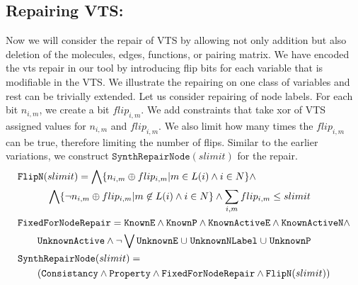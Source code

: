 \subsection{Repairing VTS:}
%
Now we will consider the repair of VTS by allowing not only addition but also
deletion of the molecules, edges, functions, or pairing matrix.
%
We have encoded the vts repair in our tool by introducing flip bits
for each variable that is modifiable in the VTS.
%
We illustrate the repairing on one class of variables and rest can be
trivially extended.
%
Let us consider repairing of node labels.
%
For each bit $n_{i,m}$, we create a bit $flip_{i,m}$.
%
We add constraints that take xor of VTS assigned values for  $n_{i,m}$
and $flip_{i,m}$.
%
We also limit how many times the $flip_{i,m}$ can be true, therefore
limiting the number of flips.
%
Similar to the earlier variations, we construct
$\texttt{SynthRepairNode}(slimit)$ for the repair.
% 
\begin{align*}
    &\texttt{FlipN}(slimit) = \bigwedge \{n_{i,m}\oplus flip_{i,m}| m \in L(i) \land i \in N \} \land \\
  & \quad \quad \quad
    \bigwedge \{ \lnot n_{i,m}\oplus flip_{i,m}| m \not \in L(i) \land i \in N \} \land  \sum\limits_{i,m} flip_{i,m} \leq slimit \\
    & \texttt{FixedForNodeRepair} =  \texttt{KnownE} \land  
      \texttt{KnownP} \land \texttt{KnownActiveE} \land \texttt{KnownActiveN}
      \land \\
  & \quad \quad \texttt{UnknownActive} \land \lnot 
    \bigvee \texttt{UnknownE} \;{\cup}\; \texttt{UnknownNLabel} \;{\cup}\;
    \texttt{UnknownP}\\
  &\texttt{SynthRepairNode}(slimit) = \\
  & \quad\quad
    (  \texttt{Consistancy}\land \texttt{Property} \land
    \texttt{FixedForNodeRepair} \land \texttt{FlipN}(slimit) )
\end{align*}




